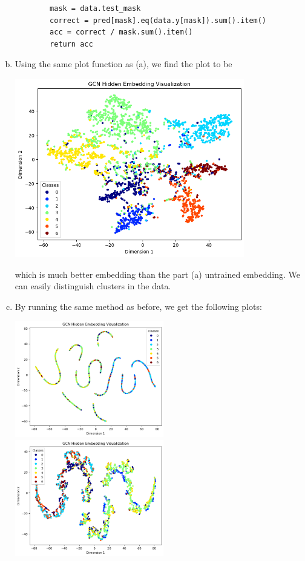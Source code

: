 \documentclass[11pt]{scrartcl}
\begin{document}
\begin{enumerate}[(a)]
\begin{verbatim}
        mask = data.test_mask
        correct = pred[mask].eq(data.y[mask]).sum().item()
        acc = correct / mask.sum().item()
        return acc
    \end{verbatim}
    \item Using the same plot function as (a), we find the plot to be \begin{center}
        \includegraphics[width=10cm]{hw2-img/hw2-p4-c.png}
    \end{center}
    which is much better embedding than the part (a) untrained embedding. We can easily distinguish clusters in the data.
    \item By running the same method as before, we get the following plots: \begin{center}
        \includegraphics[width=6.5cm]{hw2-img/hw2-p4-d1.png}
        \includegraphics[width=6.5cm]{hw2-img/hw2-p4-d2.png}

\end{center}
\end{enumerate}
\end{document}

